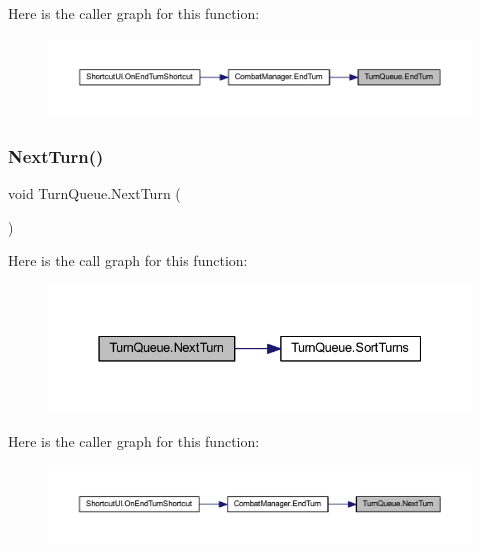 Here is the caller graph for this function\+:
\nopagebreak
\begin{figure}[H]
\begin{center}
\leavevmode
\includegraphics[width=350pt]{class_turn_queue_aadfdf0f72201cdc985ad2dbb9520eaee_icgraph}
\end{center}
\end{figure}
\mbox{\label{class_turn_queue_acae6f91ff8006307a04d4ee9362c1b7e}} 
\subsubsection{\texorpdfstring{NextTurn()}{NextTurn()}}
{\footnotesize\ttfamily void Turn\+Queue.\+Next\+Turn (\begin{DoxyParamCaption}{ }\end{DoxyParamCaption})}

Here is the call graph for this function\+:
\nopagebreak
\begin{figure}[H]
\begin{center}
\leavevmode
\includegraphics[width=331pt]{class_turn_queue_acae6f91ff8006307a04d4ee9362c1b7e_cgraph}
\end{center}
\end{figure}
Here is the caller graph for this function\+:
\nopagebreak
\begin{figure}[H]
\begin{center}
\leavevmode
\includegraphics[width=350pt]{class_turn_queue_acae6f91ff8006307a04d4ee9362c1b7e_icgraph}
\end{center}
\end{figure}
\mbox{\label{class_turn_queue_ae1c735b715ec963c76f0291cb9629338}} 
